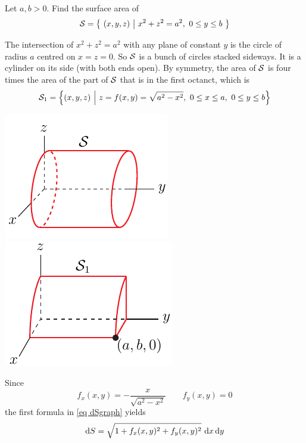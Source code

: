 \begin{eg}
       \label{eg area cylinder}
Let $a,b>0$. Find the surface area of 
\begin{equation*}
\mathcal{S} = \big\{ \ (x,y,z)\ \big|\ x^2+z^2=a^2,\ 0\le y\le b\ \big\}
\end{equation*}

\soln
The intersection of $x^2+z^2=a^2$ with any plane of constant $y$
is the circle of radius $a$ centred on $x=z=0$. So $\mathcal{S}$ is a
bunch of circles stacked sideways. It is a cylinder on its side (with both
ends open). 
By symmetry, the area of $\mathcal{S}$ is four times the area of the part of $\mathcal{S}$ 
that is in the first octanct, which is
\begin{equation*}
\cS_1 = \Big\{(x,y,z)\ \Big|\ z=f(x,y)=\sqrt{a^2-x^2},\ 0\le x\le a,\ 
                               0\le y\le b\Big\}
\end{equation*}
\begin{efig}
\begin{center}
   \includegraphics{cylinderF.pdf}\qquad
   \includegraphics{cylinderG.pdf}
\end{center}
\end{efig}
Since
\begin{equation*}
f_x(x,y)=-\frac{x}{\sqrt{a^2-x^2}}\qquad
f_y(x,y)=0
\end{equation*}
the first formula in \eqref{eq dSgraph} yields
\begin{align*}
\dee{S}&= \sqrt{1 + f_x(x,y)^2 + f_y(x,y)^2}\  \dee{x}\,\dee{y} \\

\end{align*}
\end{eg}
